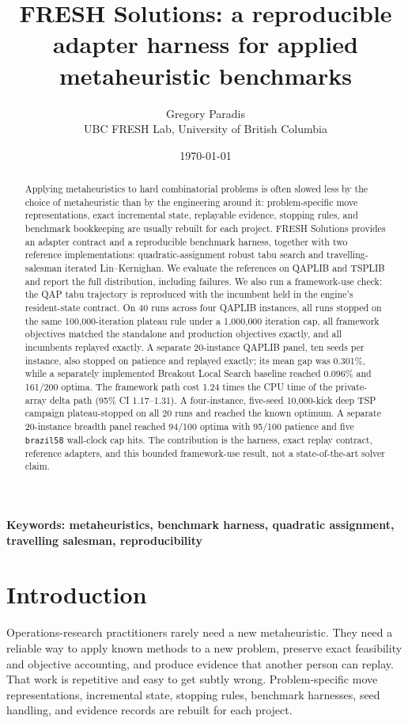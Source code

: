\documentclass[11pt]{article}
\title{FRESH Solutions: a reproducible adapter harness for applied metaheuristic benchmarks}
\author{Gregory Paradis\\UBC FRESH Lab, University of British Columbia}
\date{\today}
\begin{document}
\maketitle

\begin{abstract}
Applying metaheuristics to hard combinatorial problems is often slowed less by the choice of
metaheuristic than by the engineering around it: problem-specific move representations, exact
incremental state, replayable evidence, stopping rules, and benchmark bookkeeping are usually rebuilt
for each project. FRESH Solutions provides an adapter contract and a reproducible benchmark harness,
together with two reference implementations: quadratic-assignment robust tabu search and
travelling-salesman iterated Lin--Kernighan. We evaluate the references on QAPLIB and TSPLIB and report
the full distribution, including failures. We also run a framework-use check: the QAP tabu trajectory
is reproduced with the incumbent held in the engine's resident-state contract. On 40 runs across four
QAPLIB instances, all runs stopped on the same 100,000-iteration plateau rule under a 1,000,000
iteration cap, all framework objectives matched the standalone and production objectives exactly, and
all incumbents replayed exactly. A separate 20-instance QAPLIB panel, ten seeds per instance, also stopped on patience and replayed
exactly; its mean gap was 0.301\%, while a separately implemented Breakout Local Search baseline reached
0.096\% and 161/200 optima. The framework path cost 1.24 times
the CPU time of the private-array delta path (95\% CI 1.17--1.31). A four-instance, five-seed 10,000-kick deep TSP campaign plateau-stopped on all 20 runs and reached the known optimum. A separate 20-instance breadth panel reached 94/100 optima with 95/100 patience and five \texttt{brazil58} wall-clock cap hits. The contribution is the harness, exact replay contract, reference
adapters, and this bounded framework-use result, not a state-of-the-art solver claim.
\end{abstract}

\noindent\textbf{Keywords: metaheuristics, benchmark harness, quadratic assignment, travelling salesman, reproducibility}

\section{Introduction}

Operations-research practitioners rarely need a new metaheuristic. They need a reliable way to apply
known methods to a new problem, preserve exact feasibility and objective accounting, and produce
evidence that another person can replay. That work is repetitive and easy to get subtly wrong.
Problem-specific move representations, incremental state, stopping rules, benchmark harnesses, seed
handling, and evidence records are rebuilt for each project.
\end{document}

